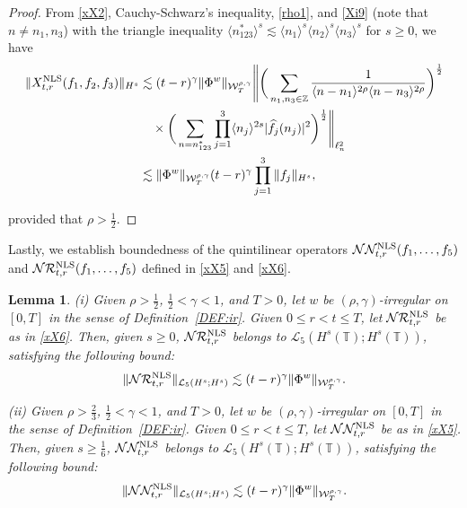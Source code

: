 \documentclass[letterpaper, 11pt,  reqno]{amsart}
\newtheorem{lemma}[theorem]{Lemma}
\newcommand{\1}{\hspace{0.5mm}\text{I}\hspace{0.5mm}}
\newcommand{\noi}{\noindent}
\newcommand{\Z}{\mathbb{Z}}
\newcommand{\T}{\mathbb{T}}
\renewcommand{\L}{\mathcal{L}}
\newcommand{\RR}{\mathcal{R}}
\newcommand{\g}{\gamma}
\newcommand{\ft}{\widehat}
\renewcommand{\l}{\ell}
\newcommand{\les}{\lesssim}
\newcommand{\jb}[1]
{\langle #1 \rangle}
\newcommand{\NN}{\mathcal{N}}
\newcommand{\W}{\mathcal{W}}
\newcommand{\NLS}{\text{\rm NLS} }
\numberwithin{equation}{section}
\numberwithin{theorem}{section}
\begin{document}
\begin{proof}

From 
\eqref{xX2},  Cauchy-Schwarz's inequality, 
\eqref{rho1}, and \eqref{Xi9} (note that $n \ne n_1, n_3$)
with the triangle inequality
 $\jb{n_{123}^*}^s \les \jb{n_1}^s\jb{n_2}^s\jb{n_3}^s$
for $s \ge 0$, 
we have 
\begin{align*}
\| X^\NLS_{t,r}  ( f _1, f _2, f_3) \|_{H^s}
& \les 
(t - r)^\g
\|\Phi^w\|_{  \W^{\rho,\g}_T} 
\Bigg\|\bigg( \sum_{n_1, n_3 \in \Z}
\frac {1}{\jb{n - n_1}^{2\rho}\jb{n - n_3}^{2\rho}}
\bigg)^\frac 12\\
& \quad \times \bigg(  
\sum_{n = n_{123}^*}
\prod_{j = 1}^3
\jb{n_j}^{2s}
 |\ft  f_j ( n_j )|^2\bigg)^\frac 12 
 \Bigg\|_{\l^2_n}\\
 & \les
 \|\Phi^w\|_{  \W^{\rho,\g}_T} 
(t - r)^\g
\prod_{j = 1}^3 \|f_j\|_{H^s}, 
\end{align*}

\noi
provided that $\rho > \frac 12$.
\end{proof}




Lastly,  we establish boundedness of 
the quintilinear operators  
$\NN \NN^\NLS_{t, r}(f_1, \dots, f_5)$
and 
$\NN \RR^\NLS_{t, r}(f_1, \dots, f_5)$
defined in  \eqref{xX5}
and \eqref{xX6}.




\begin{lemma}\label{LEM:nonlin9}
\textup{(i)}
Given $\rho > \frac 12 $,  $\frac12< \g < 1$, and $T> 0$, 
let  $w$ be $(\rho,\g)$-irregular on $[0, T]$ in the sense of Definition~\ref{DEF:ir}.
Given $0 \le r < t \le T$, let $\NN \RR^\NLS_{t, r}$
be as in \eqref{xX6}.
Then, given  $s \ge 0$, 
$\NN \RR^\NLS_{t, r}$  belongs to $\L_5(H^s(\T); H^{s}(\T))$, 
satisfying
 the following bound\textup{:}
\begin{align}
 \|\NN \RR^\NLS_{t, r}\|_{\L_5(H^s; H^{s})}
\les 
(t- r)^\g  \|\Phi^w\|_{  \W^{\rho,\g}_T}.
\label{Xnox1c}
\end{align}




\medskip

\noi
\textup{(ii)}
Given $\rho > \frac 23 $,  $\frac12< \g < 1$, and $T> 0$, 
let  $w$ be $(\rho,\g)$-irregular on $[0, T]$ in the sense of Definition~\ref{DEF:ir}.
Given $0 \le r < t \le T$, let $\NN \NN^\NLS_{t, r}$
be as in \eqref{xX5}.
Then, given  $s \ge \frac 16$, 
$\NN \NN^\NLS_{t, r}$  belongs to $\L_5(H^s(\T); H^{s}(\T))$, 
satisfying
 the following bound\textup{:}
\begin{align}
 \|\NN \NN^\NLS_{t, r}\|_{\L_5(H^s; H^{s})}
\les 
(t- r)^\g  \|\Phi^w\|_{  \W^{\rho,\g}_T}.
\label{Xnox1d}
\end{align}



\end{lemma}
\end{document}
